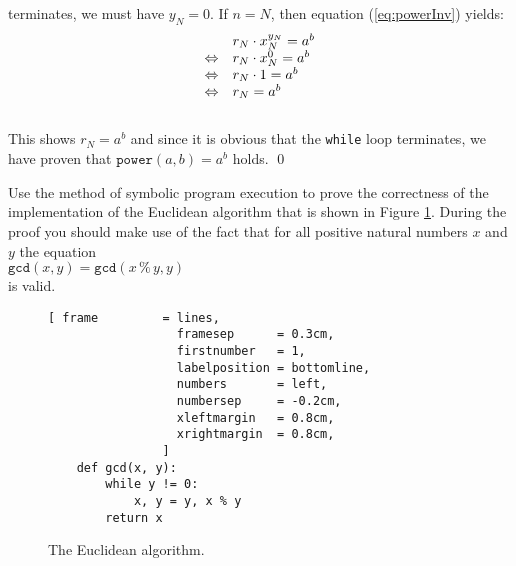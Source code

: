 terminates, we must have $y_N = 0$.  If $n=N$, then equation (\ref{eq:powerInv}) yields:
\\[0.2cm]
\hspace*{1.3cm}
$$
\begin{array}[t]{cl}
                 & r_N \cdot x_N^{y_N} = a^b \\
\Leftrightarrow  & r_N \cdot x_N^{0}  = a^b \\
\Leftrightarrow  & r_N \cdot 1       = a^b \\
\Leftrightarrow  & r_N               = a^b
\end{array}
$$
\\[0.2cm]
This shows $r_N = a^b$ and since it is obvious that the \texttt{while} loop terminates, we have proven that
$\texttt{power}(a,b) =a^b$ holds. \qed

\exercise
Use the method of symbolic program execution to prove the correctness of the implementation of the
Euclidean algorithm that is shown in Figure \ref{fig:gcd.stlx}.  During the proof you should make
use of the fact that for all positive natural numbers $x$ and $y$ the equation
\\[0.2cm]
\hspace*{1.3cm}
$\mathtt{gcd}(x, y) = \mathtt{gcd}(x \,\texttt{\%}\, y, y)$
\\[0.2cm]
is valid.  

\begin{figure}[!ht]
\centering
\begin{Verbatim}[ frame         = lines, 
                  framesep      = 0.3cm, 
                  firstnumber   = 1,
                  labelposition = bottomline,
                  numbers       = left,
                  numbersep     = -0.2cm,
                  xleftmargin   = 0.8cm,
                  xrightmargin  = 0.8cm,
                ]
    def gcd(x, y):
        while y != 0:
            x, y = y, x % y
        return x
\end{Verbatim}
\vspace*{-0.3cm}
\caption{The Euclidean algorithm.}
\label{fig:gcd.stlx}
\end{figure}

